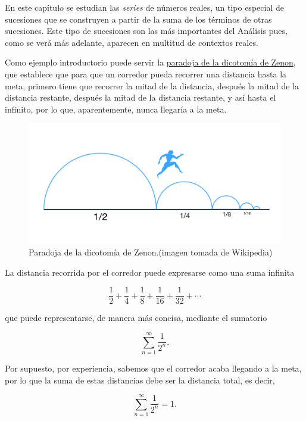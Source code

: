 \documentclass[
  a4paper,
]{scrreport}
\theoremstyle{plain}
\theoremstyle{plain}
\theoremstyle{definition}
\theoremstyle{definition}
\theoremstyle{plain}
\theoremstyle{remark}
\begin{document}
En este capítulo se estudian las \emph{series} de números reales, un
tipo especial de sucesiones que se construyen a partir de la suma de los
términos de otras sucesiones. Este tipo de sucesiones son las más
importantes del Análisis pues, como se verá más adelante, aparecen en
multitud de contextos reales.

Como ejemplo introductorio puede servir la
\href{https://es.wikipedia.org/wiki/Paradojas_de_Zen\%C3\%B3n\#Paradoja_de_la_dicotom\%C3\%ADa}{paradoja
de la dicotomía de Zenon}, que establece que para que un corredor pueda
recorrer una distancia hasta la meta, primero tiene que recorrer la
mitad de la distancia, después la mitad de la distancia restante,
después la mitad de la distancia restante, y así hasta el infinito, por
lo que, aparentemente, nunca llegaría a la meta.

\begin{figure}

{\centering \includegraphics{./img/series/paradoja-dicotomia-zenon.png}

}

\caption{Paradoja de la dicotomía de Zenon.(imagen tomada de Wikipedia)}

\end{figure}

La distancia recorrida por el corredor puede expresarse como una suma
infinita

\[
\frac{1}{2}+\frac{1}{4}+\frac{1}{8}+\frac{1}{16}+\frac{1}{32}+\cdots
\]

que puede representarse, de manera más concisa, mediante el sumatorio

\[
\sum_{n=1}^\infty \frac{1}{2^n}.
\]

Por supuesto, por experiencia, sabemos que el corredor acaba llegando a
la meta, por lo que la suma de estas distancias debe ser la distancia
total, es decir,

\[
\sum_{n=1}^\infty \frac{1}{2^n} = 1.
\]
\end{document}
